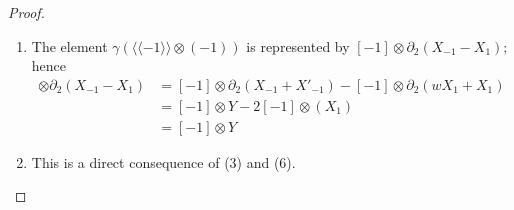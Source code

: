 \documentclass[10pt,a4paper]{amsart}
\newcommand{\Lan}{\langle \! \langle}
\newcommand{\Ran}{\rangle \! \rangle}
\newcommand{\id}{{\rm id}}
\newcommand{\im}{{\rm im}}
\newcommand{\lan}{\langle}
\newcommand{\ran}{\rangle}
\begin{document}
\begin{proof}
\begin{enumerate}
    \[
    [a]\otimes Y=d_2\otimes\id(([w|a]-[a^{-1}|w]+[a^{-1}|a])\otimes(\pmb{\infty},\pmb{0}))
    \]
    Applying $\id\otimes\partial_1$, we obtain, modulo $\im(d_3\otimes\id)$,
    \[
    \begin{split}
        d^2_{2,1}(\alpha(\lan a\ran))&=\{w([w|a]-[a^{-1}|w]+[a^{-1}|a])-([w|a]-[a^{-1}|w]+[a^{-1}|a])\}\otimes(\pmb{\infty})\\
        &=([-1|a]-[a|-1])\otimes(\pmb{\infty})
    \end{split}
    \]
    where the last line is obtained by adding the trivial element
    \[
    d_3\otimes\id(\{-[w|w|a]+[w|a^{-1}|a]-[w|a^{-1}|a]-[a|w|w]+[a|w|a]-[a|a^{-1}|w]-[a^{-1}|a|a^{-1}]\}\otimes(\pmb{\infty}))
    \]
    \item The element $\gamma(\Lan -1\Ran\otimes(-1))$ is represented by $[-1]\otimes\partial_2(X_{-1}-X_1)$; hence
    \begin{align*}
        [-1]\otimes\partial_2(X_{-1}-X_1)&=[-1]\otimes\partial_2(X_{-1}+X'_{-1})-[-1]\otimes\partial_2(wX_1+X_1)\\
        &=[-1]\otimes Y - 2[-1]\otimes(X_1)\\
        &=[-1]\otimes Y
    \end{align*}
    \item This is a direct consequence of (3) and (6).
\end{enumerate}
\end{proof}
\end{document}
